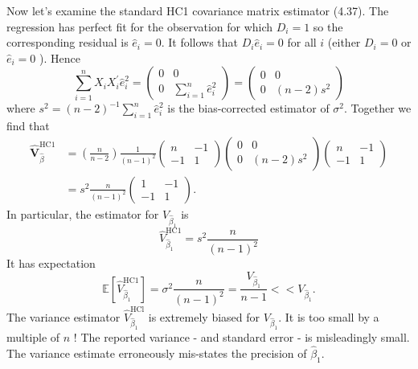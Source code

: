 \documentclass[10pt]{article}
\begin{document}
Now let's examine the standard HC1 covariance matrix estimator (4.37). The regression has perfect fit for the observation for which $D_{i}=1$ so the corresponding residual is $\widehat{e}_{i}=0$. It follows that $D_{i} \widehat{e}_{i}=0$ for all $i$ (either $D_{i}=0$ or $\widehat{e}_{i}=0$ ). Hence
$$
\sum_{i=1}^{n} X_{i} X_{i}^{\prime} \hat{e}_{i}^{2}=\left(\begin{array}{cc}
0 & 0 \\
0 & \sum_{i=1}^{n} \widehat{e}_{i}^{2}
\end{array}\right)=\left(\begin{array}{cc}
0 & 0 \\
0 & (n-2) s^{2}
\end{array}\right)
$$
where $s^{2}=(n-2)^{-1} \sum_{i=1}^{n} \widehat{e}_{i}^{2}$ is the bias-corrected estimator of $\sigma^{2}$. Together we find that
$$
\begin{aligned}
\widehat{\boldsymbol{V}}_{\widehat{\beta}}^{\mathrm{HC1}} &=\left(\frac{n}{n-2}\right) \frac{1}{(n-1)^{2}}\left(\begin{array}{cc}
n & -1 \\
-1 & 1
\end{array}\right)\left(\begin{array}{cc}
0 & 0 \\
0 & (n-2) s^{2}
\end{array}\right)\left(\begin{array}{cc}
n & -1 \\
-1 & 1
\end{array}\right) \\
&=s^{2} \frac{n}{(n-1)^{2}}\left(\begin{array}{cc}
1 & -1 \\
-1 & 1
\end{array}\right) .
\end{aligned}
$$
In particular, the estimator for $V_{\widehat{\beta}_{1}}$ is
$$
\widehat{V}_{\widehat{\beta}_{1}}^{\mathrm{HC} 1}=s^{2} \frac{n}{(n-1)^{2}}
$$
It has expectation
$$
\mathbb{E}\left[\widehat{V}_{\widehat{\beta}_{1}}^{\mathrm{HC1}}\right]=\sigma^{2} \frac{n}{(n-1)^{2}}=\frac{V_{\widehat{\beta}_{1}}}{n-1}<<V_{\widehat{\beta}_{1}} .
$$
The variance estimator $\widehat{V}_{\widehat{\beta}_{1}}^{\mathrm{HCl}}$ is extremely biased for $V_{\widehat{\beta}_{1}}$. It is too small by a multiple of $n$ ! The reported variance - and standard error - is misleadingly small. The variance estimate erroneously mis-states the precision of $\widehat{\beta}_{1}$.
\end{document}
